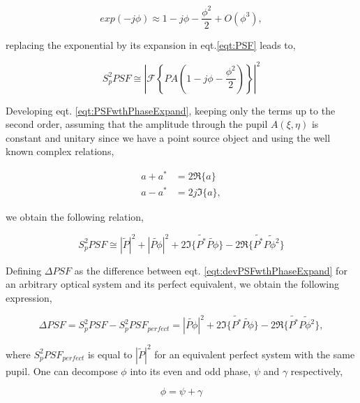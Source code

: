 \begin{equation}
exp(-j\phi)\approx 1 - j\phi - \frac{\phi^2}{2} + O(\phi^3),
\label{eqt:expansionPhase}
\end{equation}

replacing the exponential by its expansion in eqt.\eqref{eqt:PSF} leads to,

\begin{equation}
S_p^2 PSF \cong |\mathcal{F}\left\lbrace PA (1-j\phi-\frac{\phi^2}{2}) \right\rbrace|^2
\label{eqt:PSFwthPhaseExpand}
\end{equation}

Developing eqt. \eqref{eqt:PSFwthPhaseExpand}, keeping only the terms up to the second order, assuming that the amplitude through the pupil $A(\xi,\eta)$ is constant and unitary since we have a point source object and using the well known complex relations,

\begin{align}
a + a^* &= 2 \Re \lbrace a \rbrace \nonumber \\
a - a^* &= 2j \Im \lbrace a \rbrace, \nonumber
\end{align}

we obtain the following relation,

\begin{equation}
S_p^2 PSF \cong |\widetilde{P}|^2 + |\widetilde{P\phi}|^2 + 2\Im\lbrace \widetilde{P^*}\widetilde{P \phi}\rbrace - 2\Re\lbrace \widetilde{P^*}\widetilde{P \phi^2}\rbrace
\label{eqt:devPSFwthPhaseExpand}
\end{equation}

Defining $\Delta PSF$ as the difference between eqt. \eqref{eqt:devPSFwthPhaseExpand} for an arbitrary optical system and its perfect equivalent, we obtain the following expression,

\begin{equation}
\Delta PSF = S_p^2 PSF - S_p^2 PSF_{perfect} = |\widetilde{P\phi}|^2 + 2\Im\lbrace \widetilde{P^*}\widetilde{P \phi}\rbrace - 2\Re\lbrace \widetilde{P^*}\widetilde{P \phi^2}\rbrace,
\label{eqt:DeltaPSF}
\end{equation}

where $S_p^2 PSF_{perfect}$ is equal to $|\widetilde{P}|^2$ for an equivalent perfect system with the same pupil. One can decompose $\phi$ into its even and odd phase, $\psi$ and $\gamma$ respectively,

\begin{equation}
\phi = \psi + \gamma
\label{eqt:Phidecomposed}
\end{equation}

